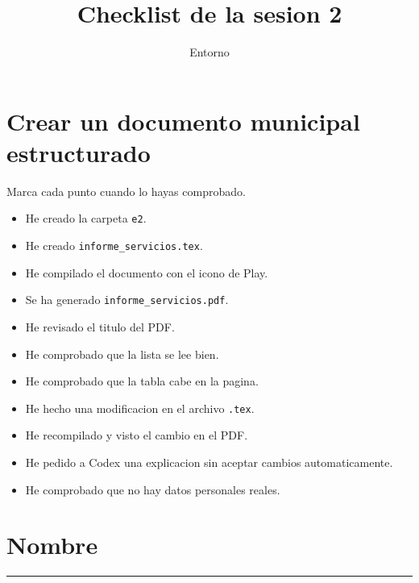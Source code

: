 \documentclass[a4paper,12pt]{article}
\title{Checklist de la sesion 2}
\author{Entorno}
\date{}
\begin{document}
\maketitle

\section*{Crear un documento municipal estructurado}

Marca cada punto cuando lo hayas comprobado.

\begin{itemize}
    \item[$\square$] He creado la carpeta \texttt{e2}.
    \item[$\square$] He creado \texttt{informe\_servicios.tex}.
    \item[$\square$] He compilado el documento con el icono de Play.
    \item[$\square$] Se ha generado \texttt{informe\_servicios.pdf}.
    \item[$\square$] He revisado el titulo del PDF.
    \item[$\square$] He comprobado que la lista se lee bien.
    \item[$\square$] He comprobado que la tabla cabe en la pagina.
    \item[$\square$] He hecho una modificacion en el archivo \texttt{.tex}.
    \item[$\square$] He recompilado y visto el cambio en el PDF.
    \item[$\square$] He pedido a Codex una explicacion sin aceptar cambios automaticamente.
    \item[$\square$] He comprobado que no hay datos personales reales.
\end{itemize}

\section*{Nombre}

\vspace{1cm}

\hrule
\end{document}
